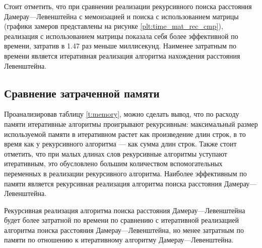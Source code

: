 Стоит отметить, что при сравнении реализации рекурсивного поиска расстояния Дамерау---Левенштейна с  мемоизацией и поиска
с использованием матрицы (графики замеров представлены на рисунке \ref{plt:time_mat_rec_cmp}), реализация с использованием матрицы показала себя более эффективной
по времени, затратив в 1.47 раз меньше миллисекунд. 
Наименее затратным по времени является итеративная реализация  алгоритма нахождения расстояния Левенштейна.

\subsection{Сравнение затраченной памяти}

Проанализировав таблицу \ref{t:memory}, можно сделать вывод, что по расходу памяти итеративные алгоритмы 
проигрывают рекурсивным: максимальный размер используемой памяти в итеративном растет как произведение длин строк,
в то время как у рекурсивного алгоритма --- как сумма длин строк.
Также стоит отметить, что при малых длинах слов рекурсивные алгоритмы уступают итеративным, это обусловлено большим 
количеством вспомогательных переменных в реализации рекурсивного алгоритма. Наиболее эффективным по памяти является рекурсивная реализация алгоритма поиска расстояния Дамерау---Левенштейна.


Рекурсивная реализация алгоритма поиска расстояния Дамерау---Левенштейна будет более затратной по времени по сравнению с итеративной реализацией алгоритма поиска расстояния Дамерау---Левенштейна, но менее затратным по памяти по отношению к итеративному алгоритму Дамерау---Левенштейна.
